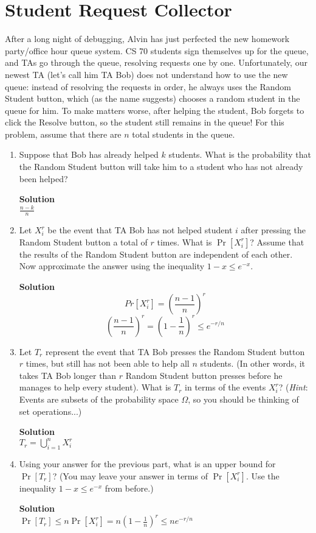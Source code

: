 \documentclass[11pt]{article}
\newcommand*{\Question}[1]{\section{#1}}
\newenvironment{Parts}{\begin{enumerate}[label=(\alph*)]}{\end{enumerate}}
\newcommand*{\Part}{\item}
\newenvironment{Answer}{\vspace{10pt}\begin{mdframed}\textbf{Solution}\\}{\end{mdframed}\vfill\pagebreak[3]}
\newenvironment{Answer}{\vspace{10pt}}{\vfill\pagebreak[3]}
\begin{document}
\Question{Student Request Collector} 

After a long night of debugging, Alvin has just perfected the new homework party/office hour queue system. CS 70 students sign themselves up for the queue, and TAs go through the queue, resolving requests one by one. Unfortunately, our newest TA (let's call him TA Bob) does not understand how to use the new queue: instead of resolving the requests in order, he always uses the Random Student button, which (as the name suggests) chooses a random student in the queue for him. To make matters worse, after helping the student, Bob forgets to click the Resolve button, so the student still remains in the queue! For this problem, assume that there are $n$ total students in the queue.
\begin{Parts}
	\Part Suppose that Bob has already helped $k$ students. What is the probability that the Random Student button will take him to a student who has not already been helped?
	\begin{Answer}
    $\frac{n-k}{n}$
	\end{Answer}

	\Part Let $X_i^r$ be the event that TA Bob has not helped student $i$ after pressing the Random Student button a total of $r$ times. What is $\Pr[X_i^r]$? Assume that the results of the Random Student button are independent of each other. Now approximate the answer using the inequality $1-x \leq e^{-x}$.
	\begin{Answer}
    $$Pr[X^r_i]=(\frac{n-1}{n})^r$$
    $$(\frac{n-1}{n})^r=(1-\frac{1}{n})^r \leq e^{-r/n}$$
	\end{Answer}

	\Part Let $T_r$ represent the event that TA Bob presses the Random Student button $r$ times, but still has not been able to help all $n$ students. (In other words, it takes TA Bob longer than $r$ Random Student button presses before he manages to help every student). What is $T_r$ in terms of the events $X_i^r$? (\textit{Hint}: Events are subsets of the probability space $\Omega$, so you should be thinking of set operations...)
	\begin{Answer}
	$T_r=\bigcup_{i=1}^n X^r_i$
	\end{Answer}

	\Part Using your answer for the previous part, what is an upper bound for $\Pr[T_r]$? (You may leave your answer in terms of $\Pr[X_i^r]$. Use the inequality $1-x \leq e^{-x}$ from before.)
	\begin{Answer}
    $\Pr[T_r]\leq n\Pr[X^r_i]=n(1-\frac{1}{n})^r\leq ne^{-r/n}$
	\end{Answer}


\end{Parts}
\end{document}
